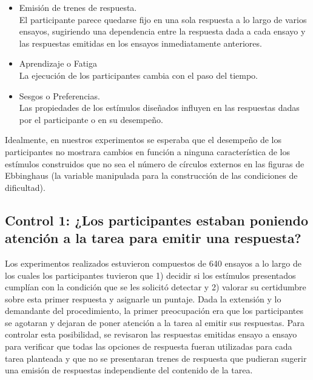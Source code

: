 \begin{itemize}
\item Emisión de trenes de respuesta.\\

El participante parece quedarse fijo en una sola respuesta a lo largo de varios ensayos, sugiriendo una dependencia entre la respuesta dada a cada ensayo y las respuestas emitidas en los ensayos inmediatamente anteriores.

\item Aprendizaje o Fatiga\\

La ejecución de los participantes cambia con  el paso del tiempo.

\item Sesgos o Preferencias.\\

Las propiedades de los estímulos diseñados influyen en las respuestas dadas por el participante o en su desempeño.  
\end{itemize}

Idealmente, en nuestros experimentos se esperaba que el desempeño de los participantes no mostrara cambios en función a ninguna característica de los estímulos construidos que no sea el número de círculos externos en las figuras de Ebbinghaus (la variable manipulada para la construcción de las condiciones de dificultad).






\subsection{Control 1: ¿Los participantes estaban poniendo atención a la tarea para emitir una respuesta?}

Los experimentos realizados estuvieron compuestos de 640 ensayos a lo largo de los cuales los participantes tuvieron que 1) decidir si los estímulos presentados cumplían con la condición que se les solicitó detectar y 2) valorar su certidumbre sobre esta primer respuesta y asignarle un puntaje. Dada la extensión y lo demandante del procedimiento, la primer preocupación era que los participantes se agotaran y dejaran de poner atención a la tarea al emitir sus respuestas. Para controlar esta posibilidad, se revisaron las respuestas emitidas ensayo a ensayo para verificar que todas las opciones de respuesta fueran utilizadas para cada tarea planteada y que no se presentaran trenes de respuesta que pudieran sugerir una emisión de respuestas independiente del contenido de la tarea.\\

